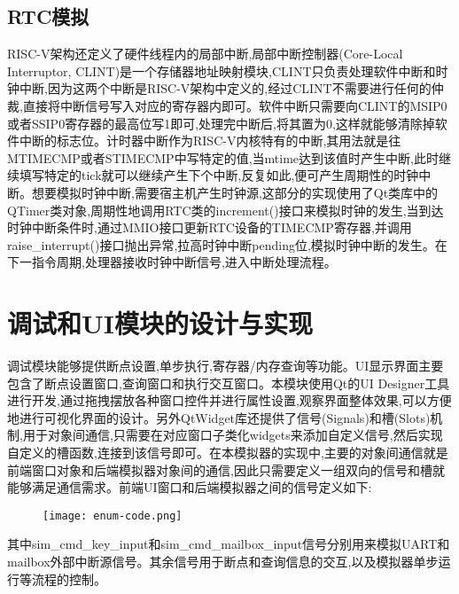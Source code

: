 \subsection{RTC模拟}

RISC-V架构还定义了硬件线程内的局部中断,局部中断控制器(Core-Local Interruptor, CLINT)是一个存储器地址映射模块,CLINT只负责处理软件中断和时钟中断,因为这两个中断是RISC-V架构中定义的,经过CLINT不需要进行任何的仲裁,直接将中断信号写入对应的寄存器内即可。软件中断只需要向CLINT的MSIP0或者SSIP0寄存器的最高位写1即可,处理完中断后,将其置为0,这样就能够清除掉软件中断的标志位。计时器中断作为RISC-V内核特有的中断,其用法就是往MTIMECMP或者STIMECMP中写特定的值,当mtime达到该值时产生中断,此时继续填写特定的tick就可以继续产生下个中断,反复如此,便可产生周期性的时钟中断。想要模拟时钟中断,需要宿主机产生时钟源,这部分的实现使用了Qt类库中的QTimer类对象,周期性地调用RTC类的increment()接口来模拟时钟的发生,当到达时钟中断条件时,通过MMIO接口更新RTC设备的TIMECMP寄存器,并调用raise\_interrupt()接口抛出异常,拉高时钟中断pending位,模拟时钟中断的发生。在下一指令周期,处理器接收时钟中断信号,进入中断处理流程。



\section{调试和UI模块的设计与实现}
调试模块能够提供断点设置,单步执行,寄存器/内存查询等功能。UI显示界面主要包含了断点设置窗口,查询窗口和执行交互窗口。本模块使用Qt的UI Designer工具进行开发,通过拖拽摆放各种窗口控件并进行属性设置,观察界面整体效果,可以方便地进行可视化界面的设计。另外QtWidget库还提供了信号(Signals)和槽(Slots)机制,用于对象间通信,只需要在对应窗口子类化widgets来添加自定义信号,然后实现自定义的槽函数,连接到该信号即可。在本模拟器的实现中,主要的对象间通信就是前端窗口对象和后端模拟器对象间的通信,因此只需要定义一组双向的信号和槽就能够满足通信需求。前端UI窗口和后端模拟器之间的信号定义如下:
\begin{figure}[H]
    \centering
    \texttt{[image: enum-code.png]}
    \label{fig:enum-code}
\end{figure}
\vspace{-0.8cm} 


其中sim\_cmd\_key\_input和sim\_cmd\_mailbox\_input信号分别用来模拟UART和mailbox外部中断源信号。其余信号用于断点和查询信息的交互,以及模拟器单步运行等流程的控制。


